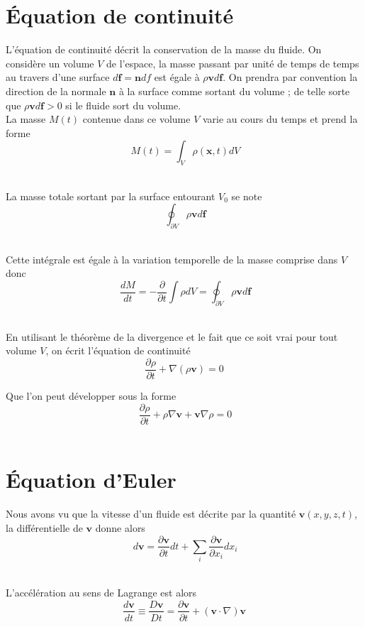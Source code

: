 \documentclass[10pt,a4paper]{book}
\begin{document}
\section{Équation de continuité}

L'équation de continuité décrit la conservation de la masse du fluide. On considère un volume $V$ de l'espace, la masse passant par unité de temps de temps au travers d'une surface $d\mathbf{f}=\mathbf{n}df$ est égale à $\rho \mathbf{v}d\mathbf{f}$. On prendra par convention la direction de la normale $\mathbf{n}$ à la surface comme sortant du volume ; de telle sorte que $\rho \mathbf{v}d\mathbf{f} >0$ si le fluide sort du volume.\\

La masse $M(t)$ contenue dans ce volume $V$ varie au cours du temps et prend la forme \[\ M(t)= \int_V \rho(\mathbf{x},t)dV  \]\

La masse totale sortant par la surface entourant $V_0$ se note \[\ \oint_{\partial V} \rho \mathbf{v}d\mathbf{f}\]\

Cette intégrale est égale à la variation temporelle de la masse comprise dans $V$ donc \[\ \frac{dM}{dt}=-\frac{\partial}{\partial t} \int \rho dV = \oint_{\partial V} \rho \mathbf{v}d\mathbf{f} \]\

En utilisant le théorème de la divergence et le fait que ce soit vrai pour tout volume $V$, on écrit l'équation de continuité 
\begin{equation}
\frac{\partial \rho}{\partial t}+\nabla (\rho \mathbf{v})=0
\end{equation}

Que l'on peut développer sous la forme \[\ \frac{\partial \rho}{\partial t}+\rho\nabla \mathbf{v}+\mathbf{v}\nabla \rho =0 \]\

\section{Équation d'Euler}

Nous avons vu que la vitesse d'un fluide est décrite par la quantité $\mathbf{v}(x,y,z,t)$, la différentielle de $\mathbf{v}$ donne alors \[\ d\mathbf{v}=\frac{\partial \mathbf{v}}{\partial t}dt+\sum_i\frac{\partial \mathbf{v}}{\partial x_i} dx_i \]\

L'accélération au sens de Lagrange est alors
\begin{equation}
\frac{d\mathbf{v}}{dt}\equiv\frac{D\mathbf{v}}{Dt} =\frac{\partial \mathbf{v}}{\partial t}+(\mathbf{v}\cdot\nabla)\mathbf{v}
\end{equation}
\end{document}
